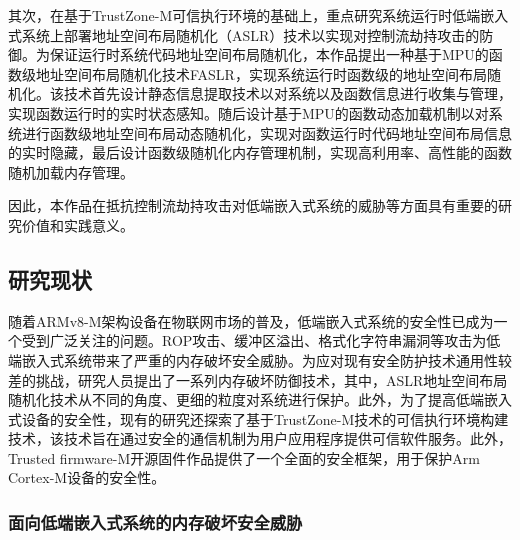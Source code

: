 \documentclass[UTF8,12pt,a4paper]{ctexart}
\numberwithin{figure}{section}
\begin{document}
\par 其次，在基于TrustZone-M可信执行环境的基础上，重点研究系统运行时低端嵌入式系统上部署地址空间布局随机化（ASLR）技术以实现对控制流劫持攻击的防御。为保证运行时系统代码地址空间布局随机化，本作品提出一种基于MPU的函数级地址空间布局随机化技术FASLR，实现系统运行时函数级的地址空间布局随机化。该技术首先设计静态信息提取技术以对系统以及函数信息进行收集与管理，实现函数运行时的实时状态感知。随后设计基于MPU的函数动态加载机制以对系统进行函数级地址空间布局动态随机化，实现对函数运行时代码地址空间布局信息的实时隐藏，最后设计函数级随机化内存管理机制，实现高利用率、高性能的函数随机加载内存管理。

\par 因此，本作品在抵抗控制流劫持攻击对低端嵌入式系统的威胁等方面具有重要的研究价值和实践意义。


\subsection{研究现状}
\par 随着ARMv8-M架构设备在物联网市场的普及，低端嵌入式系统的安全性已成为一个受到广泛关注的问题。ROP攻击、缓冲区溢出、格式化字符串漏洞等攻击为低端嵌入式系统带来了严重的内存破坏安全威胁。为应对现有安全防护技术通用性较差的挑战，研究人员提出了一系列内存破坏防御技术，其中，ASLR地址空间布局随机化技术从不同的角度、更细的粒度对系统进行保护。此外，为了提高低端嵌入式设备的安全性，现有的研究还探索了基于TrustZone-M技术的可信执行环境构建技术，该技术旨在通过安全的通信机制为用户应用程序提供可信软件服务。此外，Trusted firmware-M开源固件作品提供了一个全面的安全框架，用于保护Arm Cortex-M设备的安全性。

\subsubsection{面向低端嵌入式系统的内存破坏安全威胁}
\end{document}

